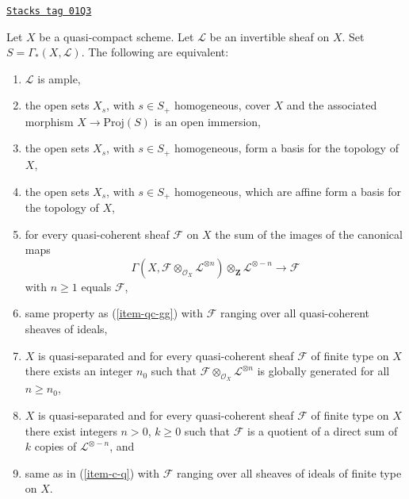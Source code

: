 \begin{proposition}
\label{properties-proposition-characterize-ample}
\href{https://stacks.math.columbia.edu/tag/01Q3}{\texttt{Stacks tag 01Q3}}

Let $X$ be a quasi-compact scheme.
Let $\mathcal{L}$ be an invertible sheaf on $X$.
Set $S = \Gamma_*(X, \mathcal{L})$.
The following are equivalent:
\begin{enumerate}
\item
\label{properties-item-ample}
$\mathcal{L}$ is ample,
\item
\label{properties-item-immersion}
the open sets $X_s$, with $s \in S_{+}$ homogeneous,
cover $X$ and the associated morphism $X \to \text{Proj}(S)$
is an open immersion,
\item
\label{properties-item-s-basis}
the open sets $X_s$, with $s \in S_{+}$ homogeneous,
form a basis for the topology of $X$,
\item
\label{properties-item-s-affine-basis}
the open sets $X_s$, with $s \in S_{+}$ homogeneous,
which are affine form a basis for the topology of $X$,
\item
\label{properties-item-qc-gg}
for every quasi-coherent sheaf $\mathcal{F}$ on $X$
the sum of the images of the canonical maps
$$
\Gamma(X, \mathcal{F} \otimes_{\mathcal{O}_X} \mathcal{L}^{\otimes n})
\otimes_{\mathbf{Z}} \mathcal{L}^{\otimes -n}
\longrightarrow
\mathcal{F}
$$
with $n \geq 1$ equals $\mathcal{F}$,
\item
\label{properties-item-qc-i-gg}
same property as (\ref{item-qc-gg}) with $\mathcal{F}$
ranging over all quasi-coherent sheaves of ideals,
\item
\label{properties-item-c-gg}
$X$ is quasi-separated and
for every quasi-coherent sheaf $\mathcal{F}$ of finite type on $X$
there exists an integer $n_0$ such that
$\mathcal{F} \otimes_{\mathcal{O}_X} \mathcal{L}^{\otimes n}$
is globally generated for all $n \geq n_0$,
\item
\label{properties-item-c-q}
$X$ is quasi-separated and
for every quasi-coherent sheaf $\mathcal{F}$ of finite type on $X$
there exist integers $n > 0$, $k \geq 0$ such that
$\mathcal{F}$ is a quotient of a direct sum of $k$ copies of
$\mathcal{L}^{\otimes - n}$, and
\item
\label{properties-item-c-i-q}
same as in (\ref{item-c-q}) with $\mathcal{F}$ ranging over all
sheaves of ideals of finite type on $X$.
\end{enumerate}
\end{proposition}

